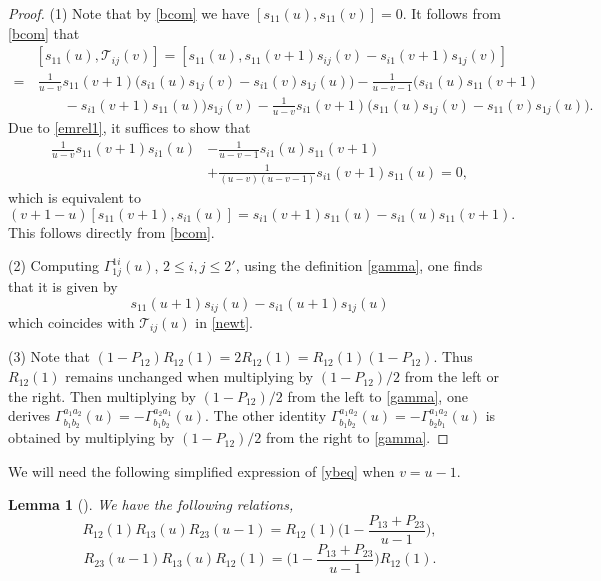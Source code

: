 \documentclass[11pt,reqno]{amsart}
\numberwithin{equation}{section}
\newtheorem{lem}[thm]{Lemma}
\theoremstyle{definition}
\theoremstyle{remark}
\newcommand{\be}{\begin{equation*}}
\newcommand{\ee}{\end{equation*}}
\newcommand{\mc}{\mathcal}
\newcommand{\lle}{\leqslant}
\begin{document}
\begin{proof}
(1) Note that by \eqref{bcom} we have $[s_{11}(u),s_{11}(v)]=0$. It follows from \eqref{bcom} that
\begin{align*}
&[s_{11}(u),\mc T_{ij}(v)]=[s_{11}(u),s_{11}(v+1)s_{ij}(v)-s_{i1}(v+1)s_{1j}(v)]\\
=&\,\frac{1}{u-v}s_{11}(v+1)\Big(s_{i1}(u)s_{1j}(v)- s_{i1}(v)s_{1j}(u) \Big)-\frac{1}{u-v-1}\Big(s_{i1}(u)s_{11}(v+1)\\
&\quad\quad -s_{i1}(v+1)s_{11}(u)\Big)s_{1j}(v)-\frac{1}{u-v}s_{i1}(v+1)\Big(s_{11}(u)s_{1j}(v)- s_{11}(v)s_{1j}(u) \Big).
\end{align*}
Due to \eqref{emrel1}, it suffices to show that
\begin{align*}
\frac{1}{u-v}s_{11}(v+1)s_{i1}(u)&-\frac{1}{u-v-1}s_{i1}(u)s_{11}(v+1) \\&+\frac{1}{(u-v)(u-v-1)}s_{i1}(v+1)s_{11}(u)=0,
\end{align*}
which is equivalent to
\[
(v+1-u)[s_{11}(v+1),s_{i1}(u)]=s_{i1}(v+1)s_{11}(u)-s_{i1}(u)s_{11}(v+1).
\]
This follows directly from \eqref{bcom}.

(2) Computing $\Gamma_{1j}^{1i}(u)$, $2\lle i,j\lle 2'$, using the definition \eqref{gamma}, one finds that it is given by $$s_{11}(u+1)s_{ij}(u)-s_{i1}(u+1)s_{1j}(u)$$ which coincides with $\mc T_{ij}(u)$ in \eqref{newt}.

(3) Note that $(1-P_{12}) R_{12}(1)=2R_{12}(1)= R_{12}(1)(1-P_{12})$. Thus $R_{12}(1)$ remains unchanged when multiplying by $(1-P_{12})/2$ from the left or the right. Then multiplying by $(1-P_{12})/2$ from the left to \eqref{gamma}, one derives $\Gamma_{b_1b_2}^{a_1a_2}(u)=-\Gamma_{b_1b_2}^{a_2a_1}(u)$. The other identity $\Gamma_{b_1b_2}^{a_1a_2}(u)=-\Gamma_{b_2b_1}^{a_1a_2}(u)$ is obtained by multiplying by $(1-P_{12})/2$ from the right to \eqref{gamma}.
\end{proof}

We will need the following simplified expression of \eqref{ybeq} when $v=u-1$.
\begin{lem}[]
\label{Rsim}
We have the following relations,
\be
R_{12}(1)R_{13}(u)R_{23}(u-1)=R_{12}(1)\Big(1-\frac{P_{13}+P_{23}}{u-1}\Big),
\ee
\be
R_{23}(u-1)R_{13}(u)R_{12}(1)=\Big(1-\frac{P_{13}+P_{23}}{u-1}\Big)R_{12}(1).
\ee
\end{lem} 

\end{document}
